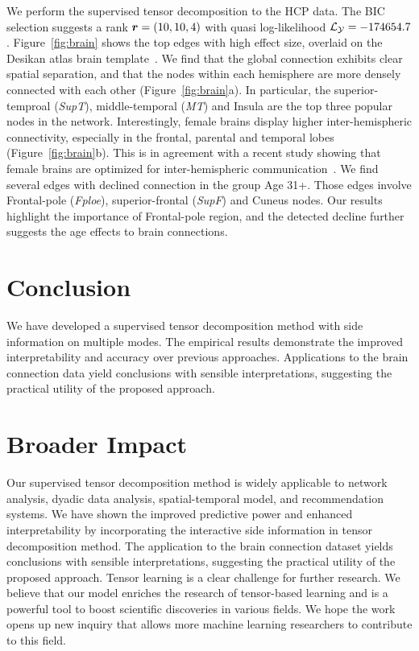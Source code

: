 \documentclass{article}
\theoremstyle{definition}
\theoremstyle{definition}
\begin{document}
We perform the supervised tensor decomposition to the HCP data. The BIC selection suggests a rank $\bm{r}=(10,10,4)$ with quasi log-likelihood $\mathcal{L}_{\mathcal{Y}}=-174654.7$. Figure~\ref{fig:brain} shows the top edges with high effect size, overlaid on the Desikan atlas brain template~\citep{desikan2006automated}. We find that the global connection exhibits clear spatial separation, and that the nodes within each hemisphere are more densely connected with each other (Figure~\ref{fig:brain}a). In particular, the superior-temproal (\emph{SupT}), middle-temporal (\emph{MT}) and Insula are the top three popular nodes in the network. Interestingly, female brains display higher inter-hemispheric connectivity, especially in the frontal, parental and temporal lobes (Figure~\ref{fig:brain}b). This is in agreement with a recent study showing that female brains are optimized for inter-hemispheric communication~\citep{ingalhalikar2014sex}. We find several edges with declined connection in the group Age 31+. Those edges involve Frontal-pole (\emph{Fploe}), superior-frontal (\emph{SupF}) and Cuneus nodes. Our results highlight the importance of Frontal-pole region, and the detected decline further suggests the age effects to brain connections. 

\section{Conclusion}
\vspace{-.2cm}
We have developed a supervised tensor decomposition method with side information on multiple modes. The empirical results demonstrate the improved interpretability and accuracy over previous approaches. Applications to the brain connection data yield conclusions with sensible interpretations, suggesting the practical utility of the proposed approach.

\newpage 
\section*{Broader Impact}

Our supervised tensor decomposition method is widely applicable to network analysis, dyadic data analysis, spatial-temporal model, and recommendation systems. We have shown the improved predictive power and enhanced interpretability by incorporating the interactive side information in tensor decomposition method.  The application to the brain connection dataset yields conclusions with sensible interpretations, suggesting the practical utility of the proposed approach.  Tensor learning is a clear challenge for further research. We believe that our model enriches the research of tensor-based learning and is a powerful tool to boost scientific discoveries in various fields. We hope the work opens up new inquiry that allows more machine learning researchers to contribute to this field.
\end{document}
